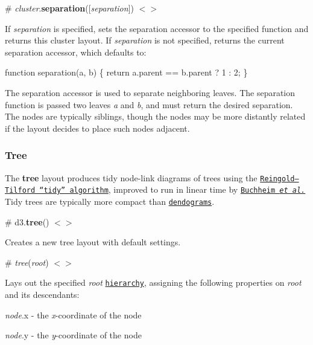 \label{_cluster_separation}%
\# {\itshape cluster}.{\bfseries separation}(\mbox{[}{\itshape separation}\mbox{]}) \href{https://github.com/d3/d3-hierarchy/blob/master/src/cluster.js#L71}{\tt $<$$>$}

If {\itshape separation} is specified, sets the separation accessor to the specified function and returns this cluster layout. If {\itshape separation} is not specified, returns the current separation accessor, which defaults to\+:


\begin{DoxyCode}
function separation(a, b) \{
  return a.parent == b.parent ? 1 : 2;
\}
\end{DoxyCode}


The separation accessor is used to separate neighboring leaves. The separation function is passed two leaves {\itshape a} and {\itshape b}, and must return the desired separation. The nodes are typically siblings, though the nodes may be more distantly related if the layout decides to place such nodes adjacent.

\subsubsection*{Tree}

\href{http://bl.ocks.org/mbostock/9d0899acb5d3b8d839d9d613a9e1fe04}{\tt }

The {\bfseries tree} layout produces tidy node-\/link diagrams of trees using the \href{http://emr.cs.iit.edu/~reingold/tidier-drawings.pdf}{\tt Reingold–\+Tilford “tidy” algorithm}, improved to run in linear time by \href{http://dirk.jivas.de/papers/buchheim02improving.pdf}{\tt Buchheim {\itshape et al.}} Tidy trees are typically more compact than \href{#cluster}{\tt dendograms}.

\label{_tree}%
\# d3.{\bfseries tree}() \href{https://github.com/d3/d3-hierarchy/blob/master/src/tree.js}{\tt $<$$>$}

Creates a new tree layout with default settings.

\label{__tree}%
\# {\itshape tree}({\itshape root}) \href{https://github.com/d3/d3-hierarchy/blob/master/src/tree.js#L106}{\tt $<$$>$}

Lays out the specified {\itshape root} \href{#hierarchy}{\tt hierarchy}, assigning the following properties on {\itshape root} and its descendants\+:


\begin{DoxyItemize}
\item {\itshape node}.x -\/ the {\itshape x}-\/coordinate of the node
\item {\itshape node}.y -\/ the {\itshape y}-\/coordinate of the node
\end{DoxyItemize}

